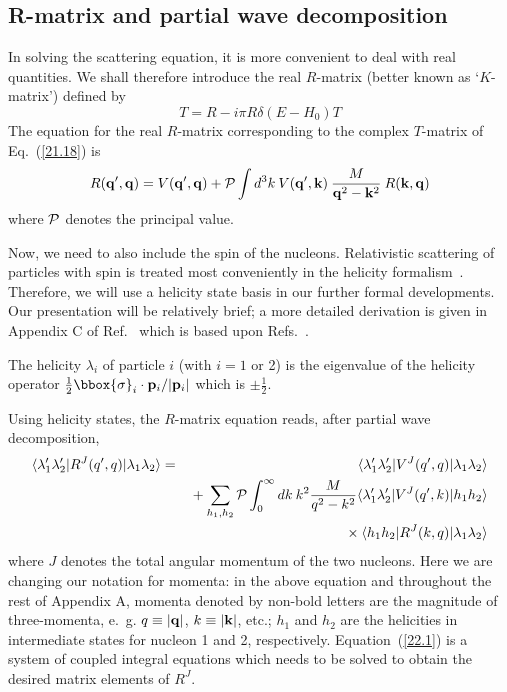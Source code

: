 \subsection{R-matrix and partial wave decomposition}

In solving the scattering equation, it is more convenient to deal
with real quantities. We shall therefore introduce the
real $R$-matrix (better known as `$K$-matrix') 
defined by
\begin{equation}
T=R-i\pi R\delta(E-H_0)T
\label{22.0}
\end{equation}
The equation for the real ${R}$-matrix corresponding to the complex 
${T}$-matrix of Eq.~(\ref{21.18}) is
\begin{equation}
{R}({\bf  q'},{\bf  q})={V}({\bf  q'},{\bf  q})+
{\cal P} \int d^3k\:
{V}({\bf  q'},{\bf  k})\:
\frac{M}
{{\bf  q}^{2}-{\bf  k}^{2}}\:
{R}({\bf  k},{\bf  q})
\label{22.00}
\end{equation}
where ${\cal P}$ denotes the principal value.

Now, we need to also include the spin of the nucleons.
Relativistic scattering of particles with spin is treated 
most conveniently in the helicity formalism~\cite{JW59}.
Therefore, we will use a helicity state basis
in our further formal developments.
Our presentation will be relatively brief;
a more detailed derivation is given in Appendix C of 
Ref.~\cite{MHE87} which is based upon Refs.~\cite{JW59,EAH71}.

The helicity $\lambda_i$ of particle $i$ (with $i=1$ or 2) 
is the eigenvalue of the helicity operator 
$\frac12 \bbox{\sigma}_i \cdot {\bf p}_i/|{\bf p}_i|$ which is 
$\pm \frac12$. 

Using helicity states, the ${R}$-matrix equation reads,
 after partial wave decomposition,
\begin{eqnarray}
\langle \lambda_1' \lambda_2'|{R}^J(q',q)|\lambda_1 \lambda_2 \rangle
&=&\langle \lambda_1' \lambda_2'|{V}^J(q',q)|\lambda_1 \lambda_2 \rangle
\nonumber \\
 & & \mbox{} + \sum_{h_1,h_2} {\cal P} \int^{\infty}_0 dk\: k^2
 \frac{M}{q^2-k^2}
\langle \lambda_1' \lambda_2'|{V}^J(q',k)|h_1 h_2 \rangle \nonumber \\
 & & \mbox{} \times
\langle h_1 h_2|{R}^J(k,q)|\lambda_1 \lambda_2 \rangle 
\label{22.1}
\end{eqnarray}
where $J$ denotes the total angular momentum of the two nucleons.
Here we are changing our notation for momenta:
in the above equation and throughout the rest of Appendix A,
momenta denoted by non-bold letters are the magnitude of three-momenta, e.~g. 
$q\equiv|{\bf  q}|$, $k\equiv|{\bf  k}|$, etc.;
$h_1$ and $h_2$ are the helicities in intermediate states for nucleon 1 and 2, 
respectively.
Equation~(\ref{22.1}) is a system 
of coupled integral equations which needs to be solved to obtain the desired
matrix elements of ${R}^J$.

